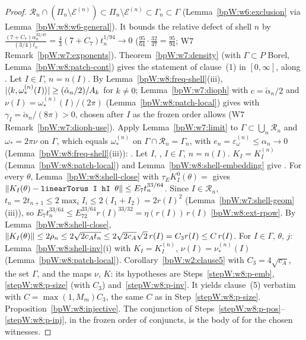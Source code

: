 \begin{proof}
$\mathcal R_n\cap(\Pi_n\setminus\mathcal E^{(n)})\subset\Pi_n\setminus\mathcal E^{(n)}\subset\Gamma_n\subset\Gamma$ (Lemma~\ref{bpW:w6:exclusion} via
Lemma~\ref{bpW:w8:w6-general}). It bounds the relative defect of shell $n$ by
$\frac{(7+C_7)\alpha_n^{32/47}}{(3/4)t_n}=\frac43(7+C_7)t_n^{1/94}\to0$ ($\frac{95}{64}\cdot\frac{32}{47}=\frac{95}{94}$; W7
Remark~\ref{bpW:w7:exponents}). Theorem~\ref{bpW:w7:density} (with $\Gamma\subset P$ Borel, Lemma~\ref{bpW:w8:patch-cont}) gives the
 statement of clause~(1) in $[0,\infty]$, along .
\label{stepW:w8:p-dioph} Let $I\in\Gamma$, $n=n(I)$. By Lemma~\ref{bpW:w8:freq-shell}(iii),
$\lvert \langle k,\omega^{(n)}_*(I)\rangle\rvert\ge(\check\alpha_n/2)/A_k$ for $k\ne0$; Lemma~\ref{bpW:w7:dioph} with $c=\check\alpha_n/2$ and
$\nu(I)=\omega^{(n)}_*(I)/(2\pi)$ (Lemma~\ref{bpW:w8:patch-local}) gives  with
$\gamma_I=\check\alpha_n/(8\pi)>0$, chosen after $I$ as the frozen order allows (W7 Remark~\ref{bpW:w7:dioph-use}).
\label{stepW:w8:p-lim} Apply Lemma~\ref{bpW:w7:limit} to $\Gamma\subset\bigcup_n\mathcal R_n$ and
$\omega_*=2\pi\nu$ on $\Gamma$, which equals $\omega^{(n)}_*$ on $\Gamma\cap\mathcal R_n=\Gamma_n$, with
$e_n=\varepsilon^{(n)}_\omega\le\alpha_n\to0$ (Lemma~\ref{bpW:w8:freq-shell}(iii)): .
\label{stepW:w8:p-emb} Let $I$, , $I\in\Gamma$, $n=n(I)$. $K_I=K^{(n)}_I$ (Lemma~\ref{bpW:w8:patch-local})
and Lemma~\ref{bpW:w8:shell-embedding} give .
\label{stepW:w8:p-close} For every $\theta$, Lemma~\ref{bpW:w8:shell-close} with $\tau_EK^0_I(\theta)=$
 gives $\lVert K_I(\theta)-\texttt{linearTorus I hI $\theta$}\rVert\le E_7t_n^{33/64}$. Since $I\in\mathcal R_n$,
$t_n=2t_{n+1}\le2\max_iI_i\le2(I_1+I_2)=2r(I)^2$ (Lemma~\ref{bpW:w7:shell-geom}(iii)), so
$E_7t_n^{33/64}\le E_72^{33/64}r(I)^{33/32}=\eta(r(I))\,r(I)$ \ref{bpW:w8:ext-rpow}.
\label{stepW:w8:p-size} By Lemma~\ref{bpW:w8:shell-close}, $\lVert K_I(\theta)\rVert\le2\rho_n\le2\sqrt{2c_At_n}\le
2\sqrt{2c_A}\sqrt2\,r(I)=C_3r(I)\le C\,r(I)$.
\label{stepW:w8:p-inv} For $I\in\Gamma$, $\theta$, $j$: Lemma~\ref{bpW:w8:shell-inv}(i) with $K_I=K^{(n)}_I$,
$\nu(I)=\nu^{(n)}_*(I)$ (Lemma~\ref{bpW:w8:patch-local}).
\label{stepW:w8:p-pde} Corollary~\ref{bpW:w2:clause5} with $C_3=4\sqrt{c_A}$, the set $\Gamma$, and the maps
$\nu$, $K$: its hypotheses are Steps~\ref{stepW:w8:p-emb}, \ref{stepW:w8:p-size} (with $C_3$) and~\ref{stepW:w8:p-inv}. It yields clause~(5)
verbatim with $C=\max(1,M_m)C_3$, the same $C$ as in Step~\ref{stepW:w8:p-size}.
\label{stepW:w8:p-inj} Proposition~\ref{bpW:w8:injective}.
\label{stepW:w8:p-assembly} The conjunction of Steps~\ref{stepW:w8:p-pos}--\ref{stepW:w8:p-inj}, in the frozen order of
conjuncts, is the body of  for the chosen witnesses.
\end{proof}
